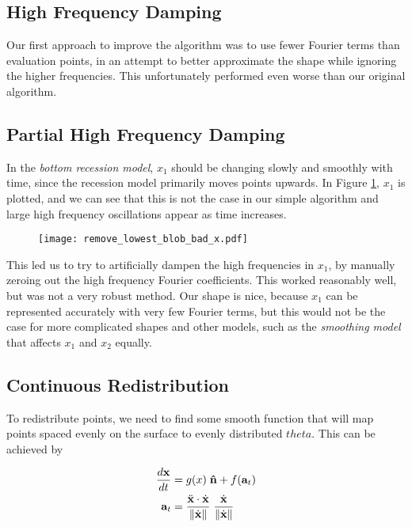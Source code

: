 \subsection*{High Frequency Damping}

Our first approach to improve the algorithm was to use fewer Fourier terms than evaluation points, in an attempt to better approximate the shape while ignoring the higher frequencies. This unfortunately performed even worse than our original algorithm.

\subsection*{Partial High Frequency Damping}

In the \textit{bottom recession model}, $x_1$ should be changing slowly and smoothly with time, since the recession model primarily moves points upwards. In Figure \ref{fig:remove-lowest-blob-bad-x}, $x_1$ is plotted, and we can see that this is not the case in our simple algorithm and large high frequency oscillations appear as time increases. 

\begin{figure}[H]
    \begin{center}
      \texttt{[image: remove\_lowest\_blob\_bad\_x.pdf]}
    \end{center}
  \vspace{-.2in} %
  \caption{\label{fig:remove-lowest-blob-bad-x}}
\end{figure}

This led us to try to artificially dampen the high frequencies in $x_1$, by manually zeroing out the high frequency Fourier coefficients. This worked reasonably well, but was not a very robust method. Our shape is nice, because $x_1$ can be represented accurately with very few Fourier terms, but this would not be the case for more complicated shapes and other models, such as the \textit{smoothing model} that affects $x_1$ and $x_2$ equally. 

\subsection*{Continuous Redistribution}

To redistribute points, we need to find some smooth function that will map points spaced evenly on the surface to evenly distributed $theta$. This can be achieved by 

\begin{align}
  \frac{d\bvec{x}}{dt}& = g(x) \; \bhat{n} + f(\bvec{a}_t)\\
  \bvec{a}_t& = \frac{\ddot{\bvec{x}} \cdot \dot{\bvec{x}}}{\norm{\dot{\bvec{x}}}} \; \frac{\dot{\bvec{x}}}{\norm{\dot{\bvec{x}}}}
\end{align}

